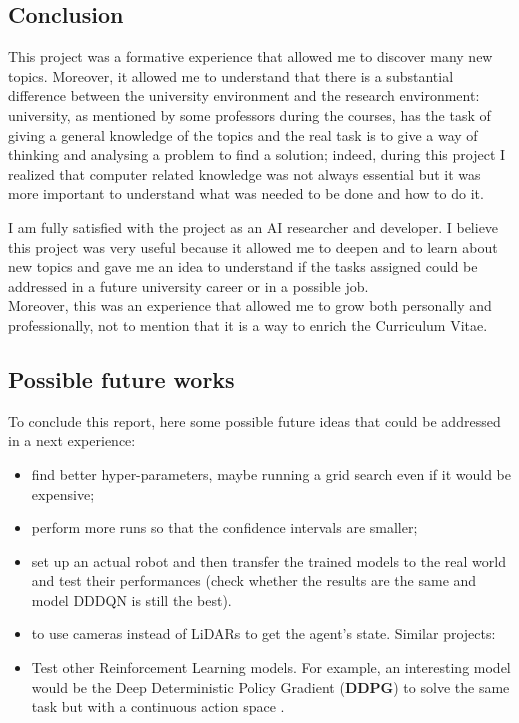 \documentclass[14pt]{extarticle}
\def\sp{\vspace{5pt}}
\def\ppn{\vspace{10pt}}
\begin{document}
\newpage
\begin{center}
	\section{Conclusion}
	\sp
\end{center}
\begin{flushleft}

This project was a formative experience that allowed me to discover many new topics. Moreover, it allowed me to understand that there is a substantial difference between the university environment and the research environment: university, as mentioned by some professors during the courses, has the task of giving a general knowledge of the topics and the real task is to give a way of thinking and analysing a problem to find a solution; indeed, during this project I realized that computer related knowledge was not always essential but it was more important to understand what was needed to be done and how to do it.
\ppn

 I am fully satisfied with the project as an AI researcher and developer. I believe this project was very useful because it allowed me to deepen and to learn about new topics and gave me an idea to understand if the tasks assigned could be addressed in a future university career or in a possible job.
\\
Moreover, this was an experience that allowed me to grow both personally and professionally, not to mention that it is a way to enrich the Curriculum Vitae.

\subsection{Possible future works}
To conclude this report, here some possible future ideas that could be addressed in a next experience:
\begin{itemize}
\item find better hyper-parameters, maybe running a grid search even if it would be expensive;
\item perform more runs so that the confidence intervals are smaller;
\item set up an actual robot and then transfer the trained models to the real world and test their performances (check whether the results are the same and model DDDQN is still the best).
\item to use cameras instead of LiDARs to get the agent's state. Similar projects: \cite{Nworks1, Nworks2}
\item Test other Reinforcement Learning models. For example, an interesting model would be the Deep Deterministic Policy Gradient (\textbf{DDPG}) to solve the same task but with a continuous action space \cite{Nworks3}.
\end{itemize}

\end{flushleft}
\end{document}
